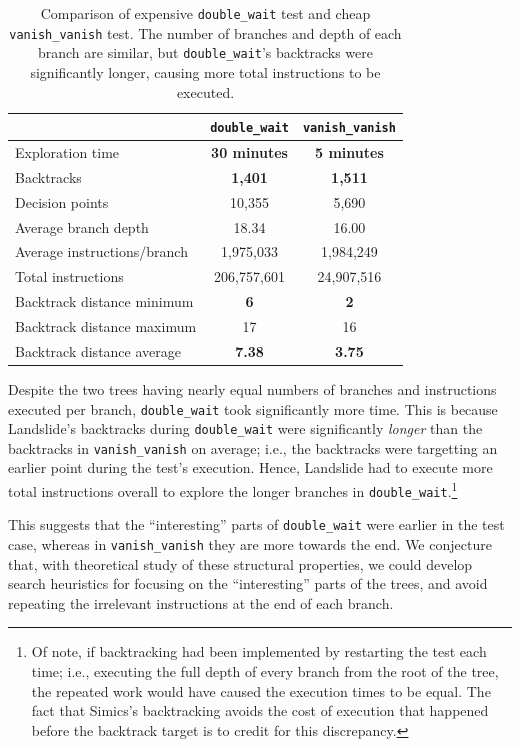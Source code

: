 \begin{table}[h]
	\small
	\centering
	\begin{tabular}{|l||c|c|}
		\hline
		& \texttt{double\_wait} & \texttt{vanish\_vanish} \\
		\hline\hline
		Exploration time & {\bf 30 minutes} & {\bf 5 minutes} \\
		\hline
		Backtracks & {\bf 1,401} & {\bf 1,511} \\
		\hline
		Decision points & 10,355 & 5,690 \\
		\hline
		Average branch depth & 18.34 & 16.00 \\
		\hline
		Average instructions/branch& 1,975,033 & 1,984,249 \\
		\hline
		Total instructions & 206,757,601 & 24,907,516 \\
		\hline
		Backtrack distance minimum & {\bf 6} & {\bf 2} \\
		\hline
		Backtrack distance maximum & 17 & 16 \\
		\hline
		Backtrack distance average & {\bf 7.38}  & {\bf 3.75} \\
		\hline
	\end{tabular}
	\caption{Comparison of expensive \texttt{double\_wait} test and cheap \texttt{vanish\_vanish} test. The number of branches and depth of each branch are similar, but \texttt{double\_wait}'s backtracks were significantly longer, causing more total instructions to be executed.}
	\label{fig:nadim-stats}
\end{table}

Despite the two trees having nearly equal numbers of branches and instructions executed per branch, \texttt{double\_wait} took significantly more time. This is because Landslide's backtracks during \texttt{double\_wait} were significantly {\em longer} than the backtracks in \texttt{vanish\_vanish} on average; i.e., the backtracks were targetting an earlier point during the test's execution.
Hence, Landslide had to execute more total instructions overall to explore the longer branches in \texttt{double\_wait}.\footnote{
Of note, if backtracking had been implemented by restarting the test each time; i.e., executing the full depth of every branch from the root of the tree, the repeated work would have caused the execution times to be equal. The fact that Simics's backtracking avoids the cost of execution that happened before the backtrack target is to credit for this discrepancy.}

This suggests that the ``interesting'' parts of \texttt{double\_wait} were earlier in the test case, whereas in \texttt{vanish\_vanish} they are more towards the end. We conjecture that, with theoretical study of these structural properties, we could develop search heuristics for focusing on the ``interesting'' parts of the trees, and avoid repeating the irrelevant instructions at the end of each branch.

